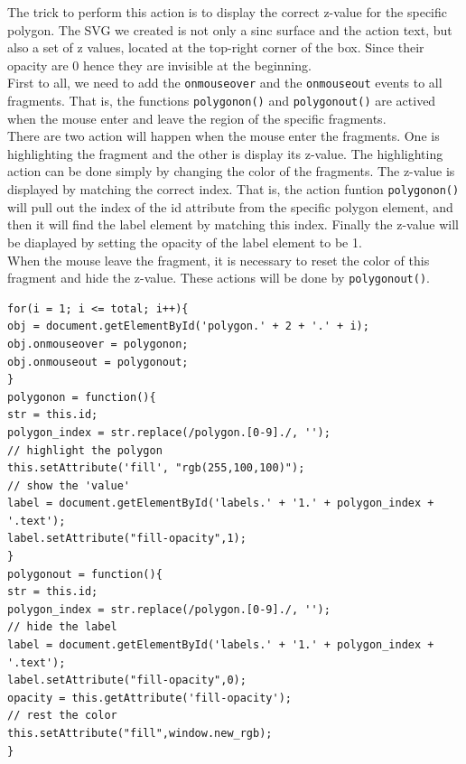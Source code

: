 \documentclass[paper=a4, fontsize=11pt]{report}
\begin{document}
The trick to perform this action is to display the correct z-value for the specific polygon. The SVG we created is not only a sinc surface and the action text, but also a set of z values, located at the top-right corner of the box. Since their opacity are 0 hence they are invisible at the beginning.\\

First to all, we need to add the \texttt{onmouseover} and the \texttt{onmouseout} events to all fragments. That is, the functions \texttt{polygonon()} and \texttt{polygonout()} are actived when the mouse enter and leave the region of the specific fragments.\\

There are two action will happen when the mouse enter the fragments. One is highlighting the fragment and the other is display its z-value. The highlighting action can be done simply by changing the color of the fragments. The z-value is displayed by matching the correct index. That is, the action funtion \texttt{polygonon()} will pull out the index of the id attribute from the specific polygon element, and then it will find the label element by matching this index. Finally the z-value will be diaplayed by setting the opacity of the label element to be 1.\\

When the mouse leave the fragment, it is necessary to reset the color of this fragment and hide the z-value. These actions will be done by \texttt{polygonout()}.

\begin{lstlisting}
for(i = 1; i <= total; i++){
obj = document.getElementById('polygon.' + 2 + '.' + i);
obj.onmouseover = polygonon;
obj.onmouseout = polygonout;
}
polygonon = function(){
str = this.id;
polygon_index = str.replace(/polygon.[0-9]./, '');
// highlight the polygon
this.setAttribute('fill', "rgb(255,100,100)");
// show the 'value'
label = document.getElementById('labels.' + '1.' + polygon_index + '.text');
label.setAttribute("fill-opacity",1);
}
polygonout = function(){
str = this.id;
polygon_index = str.replace(/polygon.[0-9]./, '');
// hide the label
label = document.getElementById('labels.' + '1.' + polygon_index + '.text');
label.setAttribute("fill-opacity",0);
opacity = this.getAttribute('fill-opacity');
// rest the color
this.setAttribute("fill",window.new_rgb);
}
\end{lstlisting}
\end{document}
